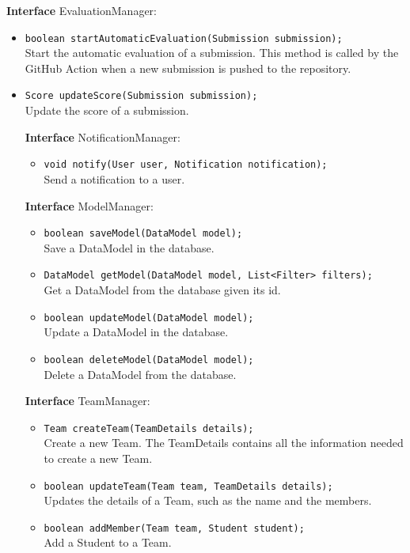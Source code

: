 \textbf{Interface} EvaluationManager:
\begin{itemize}
    \item \texttt{boolean startAutomaticEvaluation(Submission submission);}
    \\ Start the automatic evaluation of a submission. This method is called by the GitHub Action when a new submission is pushed to the repository.
    \item \texttt{Score updateScore(Submission submission);}
    \\ Update the score of a submission.

\textbf{Interface} NotificationManager:
\begin{itemize}
    \item \texttt{void notify(User user, Notification notification);}
    \\ Send a notification to a user.
\end{itemize}

\textbf{Interface} ModelManager:
\begin{itemize}
    \item \texttt{boolean saveModel(DataModel model);}
    \\ Save a DataModel in the database.
    \item \texttt{DataModel getModel(DataModel model, List<Filter> filters);}
    \\ Get a DataModel from the database given its id.
    \item \texttt{boolean updateModel(DataModel model);}
    \\ Update a DataModel in the database.
    \item \texttt{boolean deleteModel(DataModel model);}
    \\ Delete a DataModel from the database.
\end{itemize}

\textbf{Interface} TeamManager:
\begin{itemize}
    \item \texttt{Team createTeam(TeamDetails details);}
    \\ Create a new Team. The TeamDetails contains all the information needed to create a new Team.
    \item \texttt{boolean updateTeam(Team team, TeamDetails details);}
    \\ Updates the details of a Team, such as the name and the members.
    \item \texttt{boolean addMember(Team team, Student student);}
    \\ Add a Student to a Team.
\end{itemize}

\end{itemize}
